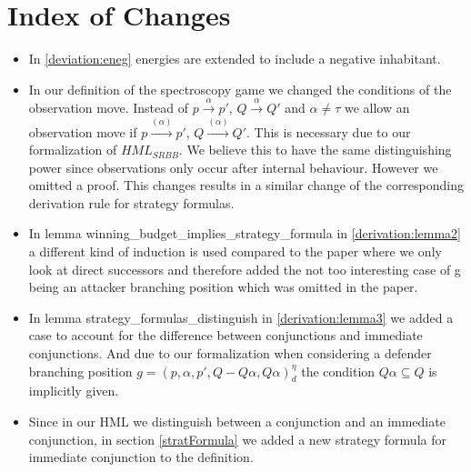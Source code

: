 \section{Index of Changes}
\begin{itemize}
    \item In \ref{deviation:eneg} energies are extended to include a negative inhabitant. 
    \item In our definition of the spectroscopy game we changed the conditions of the observation move. 
    Instead of $p \overset{\alpha}{\longrightarrow}p'$, $Q \overset{\alpha}{\longrightarrow} Q'$ and $\alpha \neq \tau$
    we allow an observation move if  $p \overset{(\alpha)}{\longrightarrow}p'$, $Q \overset{(\alpha)}{\longrightarrow} Q'$.
    This is necessary due to our formalization of $HML_{SRBB}$. We believe this to have the same distinguishing power 
    since observations only occur after internal behaviour. However we omitted a proof. 
    This changes results in a similar change of the corresponding derivation rule for strategy formulas.
    \item In lemma winning\_budget\_implies\_strategy\_formula in \ref{derivation:lemma2} a different kind of induction is used compared to the paper 
    where we only look at direct successors and therefore added the not too interesting case of g being an 
    attacker branching position which was omitted in the paper.
   \item In lemma strategy\_formulas\_distinguish in  \ref{derivation:lemma3} we added a case to account for the difference between 
conjunctions and immediate conjunctions. And due to our formalization when considering a
defender branching position $g=(p,\alpha ,p', Q - Q\alpha, Q\alpha)_d^\eta$ the condition 
$Q \alpha \subseteq Q$ is implicitly given.
  \item Since in our HML we distinguish between a conjunction and an immediate conjunction, in section \ref{stratFormula} 
we added a new strategy formula for immediate conjunction to the definition.
\end{itemize}
